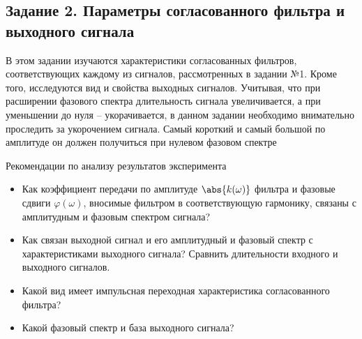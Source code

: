 \subsection{Задание 2. Параметры согласованного фильтра и выходного сигнала}
В этом задании изучаются характеристики согласованных фильтров,
соответствующих каждому из сигналов, рассмотренных в задании №1. Кроме
того, исследуются вид и свойства выходных сигналов. Учитывая, что при
расширении фазового спектра длительность сигнала увеличивается, а при
уменьшении до нуля – укорачивается, в данном задании необходимо
внимательно проследить за укорочением сигнала. Самый короткий и самый
большой по амплитуде он должен получиться при нулевом фазовом спектре


Рекомендации по анализу результатов эксперимента
\begin{itemize}
    \item Как коэффициент передачи по амплитуде $\abs{k(\omega)}$ фильтра и фазовые
    сдвиги $\varphi(\omega)$, вносимые фильтром в соответствующую гармонику,
    связаны с амплитудным и фазовым спектром сигнала?
    \item Как связан выходной сигнал и его амплитудный и фазовый спектр с
    характеристиками выходного сигнала? Сравнить длительности
    входного и выходного сигналов.
    \item Какой вид имеет импульсная переходная характеристика
    согласованного фильтра?
    \item Какой фазовый спектр и база выходного сигнала? 
\end{itemize}



